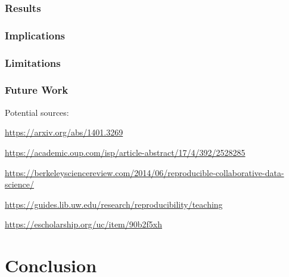 \documentclass[12pt,twoside]{reedthesis}
\begin{document}
\hypertarget{results}{%
\subsection{Results}\label{results}}

\hypertarget{implications}{%
\subsection{Implications}\label{implications}}

\hypertarget{limitations}{%
\subsection{Limitations}\label{limitations}}

\hypertarget{future-work}{%
\subsection{Future Work}\label{future-work}}

Potential sources:

\url{https://arxiv.org/abs/1401.3269}

\url{https://academic.oup.com/isp/article-abstract/17/4/392/2528285}

\url{https://berkeleysciencereview.com/2014/06/reproducible-collaborative-data-science/}

\url{https://guides.lib.uw.edu/research/reproducibility/teaching}

\url{https://escholarship.org/uc/item/90b2f5xh}

\hypertarget{conclusion}{%
\chapter*{Conclusion}\label{conclusion}}
\end{document}
